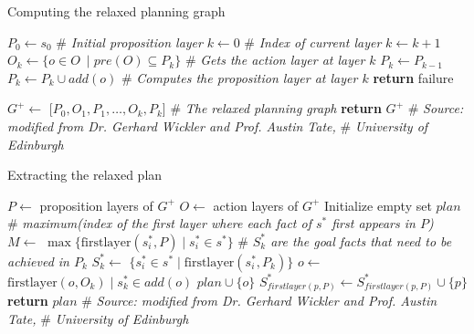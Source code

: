 \documentclass[ppgc,diss,english]{iiufrgs}
\begin{document}
\begin{algorithm}
\caption{Computing the relaxed planning graph}
\label{alg:computing-rpg}
\begin{algorithmic}[1]
  \State $P_{0} \gets s_{0}$ \# \emph{Initial proposition layer}
  \State $k \gets 0$ \# \emph{Index of current layer}
    \State $k \gets k + 1$
    \State $O_{k} \gets \{o \in O\ \mid pre(O) \subseteq P_{k}\}$ \# \emph{Gets the action layer at layer $k$}
    \State $P_{k} \gets P_{k-1}$
      \State $P_{k} \gets P_{k} \cup add(o)$ \# \emph{Computes the proposition layer at layer $k$}
    \EndFor
      \State \textbf{return} failure
    \EndIf

  \EndWhile

  \State $G^{+} \gets $ [$P_{0}, O_{1}, P_{1},\ldots,O_{k}, P_{k}$] \# \emph{The relaxed planning graph}
  \State \textbf{return} $G^{+}$
\EndProcedure
\State \# \emph{Source: modified from Dr. Gerhard Wickler and Prof. Austin Tate,}
\State \# \emph{University of Edinburgh}
\end{algorithmic}
\end{algorithm}

\begin{algorithm}
\caption{Extracting the relaxed plan}
\label{alg:extracting-relaxed-plan}
\begin{algorithmic}[1]
  \State $P \gets$ proposition layers of $G^{+}$
  \State $O \gets$ action layers of $G^{+}$
  \State Initialize empty set $plan$
  \State \# \emph{maximum(index of the first layer where each fact of $s^{*}$ first appears in $P$)}
  \State $M \gets$ $\max \{\text{firstlayer}(s_{i}^{*}, P) \mid s_{i}^{*} \in s^{*}\}$
    \State \# \emph{$S_{k}^{*}$ are the goal facts that need to be achieved in $P_{k}$}
    \State $S_{k}^{*} \gets$ $\{s_{i}^{*} \in s^{*} \mid \text{firstlayer}(s_{i}^{*}, P_{k})\}$
  \EndFor
      \State $o \gets$ $\text{firstlayer}(o, O_{k}) \mid s_{k}^{*} \in add(o)$
      \State $plan \cup \{o\}$
        \State $S_{firstlayer(p, P)}^{*} \gets S_{firstlayer(p, P)}^{*} \cup \{p\}$
      \EndFor
    \EndFor
  \EndFor
  \State \textbf{return} $plan$
\EndProcedure
\State \# \emph{Source: modified from Dr. Gerhard Wickler and Prof. Austin Tate,}
\State \# \emph{University of Edinburgh}
\end{algorithmic}
\end{algorithm}
\end{document}
